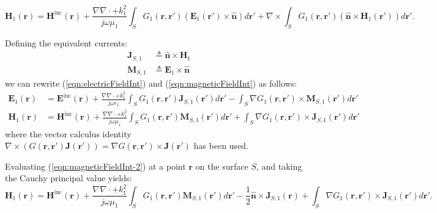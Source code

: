 \documentclass[a4paper,10pt]{book}
\newcommand{\field}[1]{\mathbf{#1}}
\newcommand{\current}[1]{\mathbf{#1}}
\newcommand{\vect}[1]{\mathbf{#1}}
\begin{document}
\begin{equation}\label{eqn:magneticFieldInt}
\field{H}_1\left(\vect{r}\right) = \field{H}^\text{inc}\left(\vect{r}\right) + \frac{\nabla \nabla \cdot + k_1^2}{j \omega \mu_1} \int_S G_1(\vect{r}, \vect{r}') \left(\field{E}_1\left(\vect{r}'\right) \times \vect{\hat{n}}\right) d\vect{r}' + \nabla \times \int_S G_1(\vect{r}, \vect{r}') \left(  \vect{\hat{n}} \times \field{H}_1\left(\vect{r}'\right) \right) d\vect{r}'.
\end{equation}
%
\par
Defining the equivalent currents:
\begin{align}
\current{J}_{S,1} &\triangleq \vect{\hat{n}} \times \field{H}_1 \\
\current{M}_{S,1} &\triangleq \field{E}_1 \times \vect{\hat{n}} 
\end{align}
we can rewrite (\ref{eqn:electricFieldInt}) and (\ref{eqn:magneticFieldInt}) as follows:
\begin{align}
\field{E}_1\left(\vect{r}\right) &= \field{E}^\text{inc}\left(\vect{r}\right) + \frac{\nabla \nabla \cdot + k_1^2}{j \omega \epsilon_1} \int_S G_1(\vect{r}, \vect{r}') \current{J}_{S,1}\left(\vect{r}'\right) d\vect{r}' - \int_S \nabla G_1(\vect{r}, \vect{r}') \times \current{M}_{S,1}\left(\vect{r}'\right) d\vect{r}' \label{eqn:electricFieldInt-2} \\
\field{H}_1\left(\vect{r}\right) &= \field{H}^\text{inc}\left(\vect{r}\right) + \frac{\nabla \nabla \cdot + k_1^2}{j \omega \mu_1} \int_S G_1(\vect{r}, \vect{r}') \current{M}_{S,1}\left(\vect{r}'\right) d\vect{r}' + \int_S \nabla G_1(\vect{r}, \vect{r}') \times \current{J}_{S,1}\left(\vect{r}'\right) d\vect{r}' \label{eqn:magneticFieldInt-2}
\end{align}
where the vector calculus identity $\nabla \times \left( G(\vect{r}, \vect{r}') \current{J}\left(\vect{r}'\right)\right) = \nabla G(\vect{r}, \vect{r}') \times \current{J}\left(\vect{r}'\right)$ has been used.
%
\par
Evaluating (\ref{eqn:magneticFieldInt-2}) at a point $\vect{r}$ on the surface $S$, and taking the Cauchy principal value \cite{Arnoldus2011} yields:
\begin{equation}\label{eqn:magneticFieldInt-3}
\field{H}_1\left(\vect{r}\right) = \field{H}^\text{inc}\left(\vect{r}\right) + \frac{\nabla \nabla \cdot + k_1^2}{j \omega \mu_1} \int_S G_1(\vect{r}, \vect{r}') \current{M}_{S,1}\left(\vect{r}'\right) d\vect{r}' -\frac{1}{2} \vect{\hat{n}} \times \current{J}_{S,1}\left(\vect{r}\right) + \int_S \nabla G_1(\vect{r}, \vect{r}') \times \current{J}_{S,1}\left(\vect{r}'\right) d\vect{r}'.
\end{equation}
\end{document}
